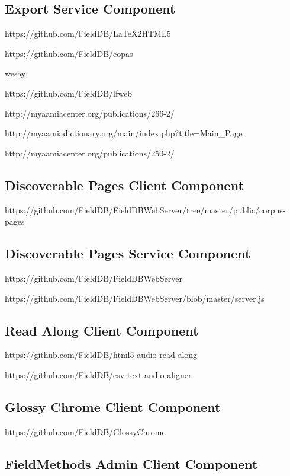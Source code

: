 \documentclass[12pt]{article}
\begin{document}
\subsection{Export Service Component}


https://github.com/FieldDB/LaTeX2HTML5

https://github.com/FieldDB/eopas


wesay: 

https://github.com/FieldDB/lfweb

http://myaamiacenter.org/publications/266-2/

http://myaamiadictionary.org/main/index.php?title=Main\_Page


http://myaamiacenter.org/publications/250-2/

\subsection{Discoverable Pages Client Component}

https://github.com/FieldDB/FieldDBWebServer/tree/master/public/corpus-pages

\subsection{Discoverable Pages Service Component}

https://github.com/FieldDB/FieldDBWebServer

https://github.com/FieldDB/FieldDBWebServer/blob/master/server.js


\subsection{Read Along Client Component}

https://github.com/FieldDB/html5-audio-read-along

https://github.com/FieldDB/esv-text-audio-aligner

\subsection{Glossy Chrome Client Component}

https://github.com/FieldDB/GlossyChrome



\subsection{FieldMethods Admin Client Component}
\end{document}
